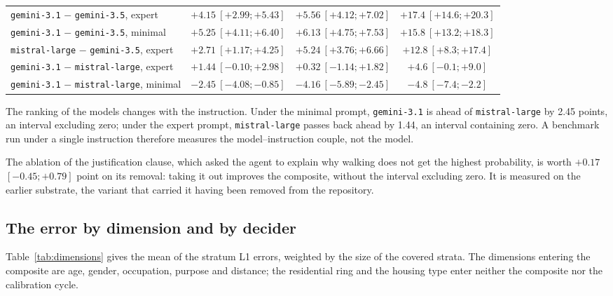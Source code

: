\begin{table}[tp]
\begin{tabular}{@{}lccc@{}}
    \midrule
    \texttt{gemini-3.1} $-$ \texttt{gemini-3.5}, expert     & $\mathbf{+4.15}\ [+2.99; +5.43]$ & $\mathbf{+5.56}\ [+4.12; +7.02]$ & $\mathbf{+17.4}\ [+14.6; +20.3]$ \\
    \texttt{gemini-3.1} $-$ \texttt{gemini-3.5}, minimal    & $\mathbf{+5.25}\ [+4.11; +6.40]$ & $\mathbf{+6.13}\ [+4.75; +7.53]$ & $\mathbf{+15.8}\ [+13.2; +18.3]$ \\
    \texttt{mistral-large} $-$ \texttt{gemini-3.5}, expert  & $\mathbf{+2.71}\ [+1.17; +4.25]$ & $\mathbf{+5.24}\ [+3.76; +6.66]$ & $\mathbf{+12.8}\ [+8.3; +17.4]$ \\
    \texttt{gemini-3.1} $-$ \texttt{mistral-large}, expert  & $+1.44\ [-0.10; +2.98]$ & $+0.32\ [-1.14; +1.82]$ & $+4.6\ [-0.1; +9.0]$ \\
    \texttt{gemini-3.1} $-$ \texttt{mistral-large}, minimal & $\mathbf{-2.45}\ [-4.08; -0.85]$ & $\mathbf{-4.16}\ [-5.89; -2.45]$ & $\mathbf{-4.8}\ [-7.4; -2.2]$ \\
    \bottomrule
  \end{tabular}
\end{table}

The ranking of the models changes with the instruction. Under the minimal prompt, \texttt{gemini-3.1} is ahead of \texttt{mistral-large} by 2.45 points, an interval excluding zero; under the expert prompt, \texttt{mistral-large} passes back ahead by 1.44, an interval containing zero. A benchmark run under a single instruction therefore measures the model--instruction couple, not the model.

The ablation of the justification clause, which asked the agent to explain why walking does not get the highest probability, is worth $+0.17$ $[-0.45; +0.79]$ point on its removal: taking it out improves the composite, without the interval excluding zero. It is measured on the earlier substrate, the variant that carried it having been removed from the repository.

\subsection{The error by dimension and by decider}

Table~\ref{tab:dimensions} gives the mean of the stratum L1 errors, weighted by the size of the covered strata. The dimensions entering the composite are age, gender, occupation, purpose and distance; the residential ring and the housing type enter neither the composite nor the calibration cycle.

